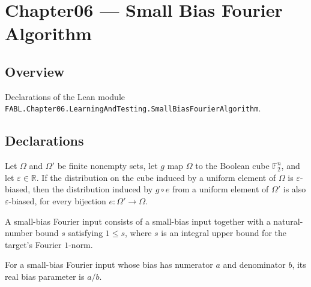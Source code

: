\chapter{Chapter06 — Small Bias Fourier Algorithm}
\section{Overview}

Declarations of the Lean module \texttt{FABL.Chapter06.LearningAndTesting.SmallBiasFourierAlgorithm}.

\section{Declarations}

\begin{theorem}
\label{FABL.ProbabilityDensity.IsBiased.uniformPushforward_comp_equiv}
\leanok
{}
Let $\Omega$ and $\Omega'$ be finite nonempty sets, let $g$ map $\Omega$ to the Boolean
cube $\mathbb{F}_2^n$, and let $\varepsilon\in\mathbb{R}$. If the distribution on the
cube induced by a uniform element of $\Omega$ is $\varepsilon$-biased, then the
distribution induced by $g\circ e$ from a uniform element of $\Omega'$ is also
$\varepsilon$-biased, for every bijection $e:\Omega'\to\Omega$.
\end{theorem}

\begin{definition}
\label{FABL.SmallBiasFourierInput}
\leanok
{}
A small-bias Fourier input consists of a small-bias input together with a natural-number
bound $s$ satisfying $1\le s$, where $s$ is an integral upper bound for the target's
Fourier $1$-norm.
\end{definition}

\begin{definition}
\label{FABL.SmallBiasFourierInput.epsilon}
\leanok
{}
For a small-bias Fourier input whose bias has numerator $a$ and denominator $b$, its
real bias parameter is $a/b$.
\end{definition}

